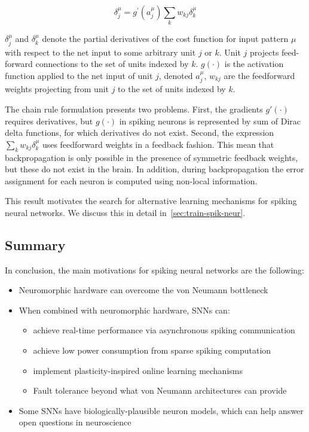 \documentclass[fyp]{socreport}
\begin{document}
\begin{equation}
  \label{chainrule}
  \delta_{j}^{\mu}=g^{\prime}\left(a_{j}^{\mu}\right) \sum_{k} w_{k j} \delta_{k}^{\mu}
\end{equation}

\(\delta_{j}^{\mu}\) and \(\delta_{k}^{\mu}\) denote the partial derivatives of
the cost function for input pattern \(\mu\) with respect to the net input to
some arbitrary unit \(j\) or \(k\). Unit \(j\) projects feed-forward connections
to the set of units indexed by \(k\). \(g(\cdot)\) is the activation function
applied to the net input of unit \(j\), denoted \(a_j^{\mu}\), \(w_{kj}\) are
the feedforward weights projecting from unit \(j\) to the set of units indexed
by \(k\).

The chain rule formulation presents two problems. First, the gradients
\(g'(\cdot)\) requires derivatives, but \(g(\cdot)\) in spiking neurons is
represented by sum of Dirac delta functions, for which derivatives do not
exist. Second, the expression \(\sum_{k} w_{k j} \delta_{k}^{\mu}\) uses
feedforward weights in a feedback fashion. This mean that backpropagation is
only possible in the presence of symmetric feedback weights, but these do not
exist in the brain. In addition, during backpropagation the error assignment for
each neuron is computed using non-local information.

This result motivates the search for alternative learning mechanisms for spiking
neural networks. We discuss this in detail in~\autoref{sec:train-spik-neur}.

\subsection{Summary}
In conclusion, the main motivations for spiking neural networks are the
following:

\begin{itemize}
  \item Neuromorphic hardware can overcome the von Neumann bottleneck
  \item When combined with neuromorphic hardware, SNNs can:
  \begin{itemize}
    \item achieve real-time performance via asynchronous spiking communication
    \item achieve low power consumption from sparse spiking computation
    \item implement plasticity-inspired online learning mechanisms
    \item Fault tolerance beyond what von Neumann architectures can provide
  \end{itemize}
  \item Some SNNs have biologically-plausible neuron models, which can help
  answer open questions in neuroscience
\end{itemize}
\end{document}

